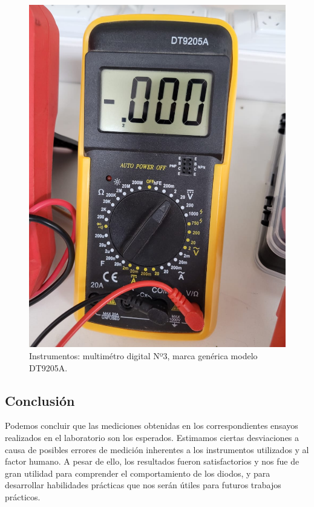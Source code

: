 \documentclass[chaptersright]{informeutn}
\begin{document}
\begin{figure}[H]
\begin{minipage}{0.3\textwidth}
            \includegraphics[width=\textwidth]{pictures/multimetro-angelo.jpeg}
            \caption{Instrumentos: multimétro digital Nº3, marca genérica modelo DT9205A.}
        \end{minipage}
    \end{figure}

    \subsection{Conclusión}
        Podemos concluir que las mediciones obtenidas en los correspondientes ensayos realizados en el laboratorio son los esperados. Estimamos ciertas desviaciones a causa de posibles errores de medición inherentes a los instrumentos utilizados y al factor humano. A pesar de ello, los resultados fueron satisfactorios y nos fue de gran utilidad para comprender el comportamiento de los diodos, y para desarrollar habilidades prácticas que nos serán útiles para futuros trabajos prácticos. 
    
\end{document}
